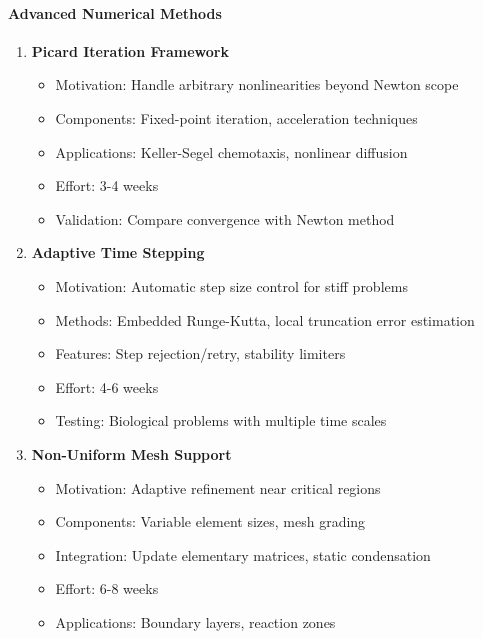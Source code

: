 \paragraph{Advanced Numerical Methods}
\begin{enumerate}
    \item \textbf{Picard Iteration Framework}
    \begin{itemize}
        \item Motivation: Handle arbitrary nonlinearities beyond Newton scope
        \item Components: Fixed-point iteration, acceleration techniques
        \item Applications: Keller-Segel chemotaxis, nonlinear diffusion
        \item Effort: 3-4 weeks
        \item Validation: Compare convergence with Newton method
    \end{itemize}
    
    \item \textbf{Adaptive Time Stepping}
    \begin{itemize}
        \item Motivation: Automatic step size control for stiff problems
        \item Methods: Embedded Runge-Kutta, local truncation error estimation
        \item Features: Step rejection/retry, stability limiters
        \item Effort: 4-6 weeks
        \item Testing: Biological problems with multiple time scales
    \end{itemize}
    
    \item \textbf{Non-Uniform Mesh Support}
    \begin{itemize}
        \item Motivation: Adaptive refinement near critical regions
        \item Components: Variable element sizes, mesh grading
        \item Integration: Update elementary matrices, static condensation
        \item Effort: 6-8 weeks
        \item Applications: Boundary layers, reaction zones
    \end{itemize}
\end{enumerate}

